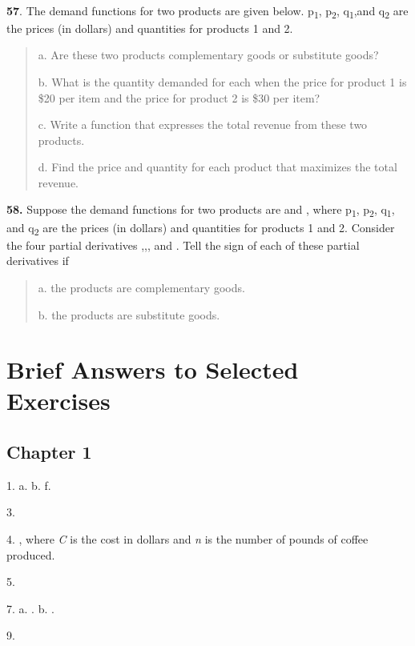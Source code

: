 \textbf{\\
}

\textbf{57}. The demand functions for two products are given below.
p\textsubscript{1}, p\textsubscript{2}, q\textsubscript{1},and
q\textsubscript{2} are the prices (in dollars) and quantities for
products 1 and 2.

\begin{quote}
a. Are these two products complementary goods or substitute goods?

b. What is the quantity demanded for each when the price for product 1
is \$20 per item and the price for product 2 is \$30 per item?

c. Write a function that expresses the total revenue from these two
products.

d. Find the price and quantity for each product that maximizes the total
revenue.
\end{quote}

\textbf{58.} Suppose the demand functions for two products are and ,
where p\textsubscript{1}, p\textsubscript{2}, q\textsubscript{1}, and
q\textsubscript{2} are the prices (in dollars) and quantities for
products 1 and 2. Consider the four partial derivatives ,,, and . Tell
the sign of each of these partial derivatives if

\begin{quote}
a. the products are complementary goods.

b. the products are substitute goods.
\end{quote}

\hypertarget{brief-answers-to-selected-exercises}{\section{Brief Answers
to Selected Exercises}\label{brief-answers-to-selected-exercises}}

\hypertarget{chapter-1}{\subsection{Chapter 1}\label{chapter-1}}

1. a. b. f.

3.

4. , where \emph{C} is the cost in dollars and \emph{n} is the number of
pounds of coffee produced.

5.

7. a. . b. .

9.

